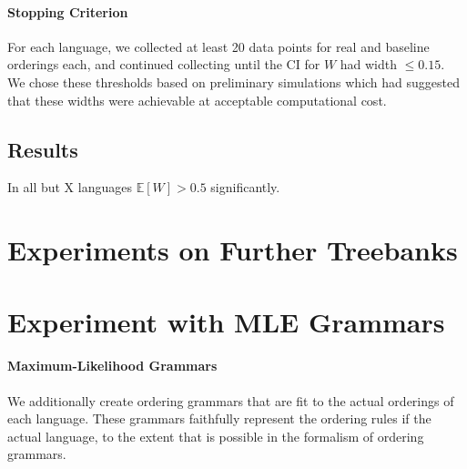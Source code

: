 \documentclass[11pt,letterpaper]{article}
\newcommand{\E}[0]{\mathbb{E}}
\begin{document}
%


\paragraph{Stopping Criterion}

For each language, we collected at least 20 data points for real and baseline orderings each, and continued collecting until the CI for $W$ had width $\leq 0.15$.
We chose these thresholds based on preliminary simulations which had suggested that these widths were achievable at acceptable computational cost.

%



%
%



\subsection{Results}




In all but X languages $\E[W] > 0.5$ significantly.



\section{Experiments on Further Treebanks}





\appendix

\section{Experiment with MLE Grammars}


\paragraph{Maximum-Likelihood Grammars}
We additionally create ordering grammars that are fit to the actual orderings of each language.
These grammars faithfully represent the ordering rules if the actual language, to the extent that is possible in the formalism of ordering grammars.
\end{document}
